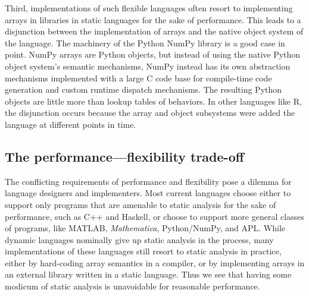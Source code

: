 \documentclass[preprint]{sigplanconf}
\newcommand{\MATLAB}{\textsc{MATLAB}}
\newcommand{\Mathematica}{\textit{Mathematica}}
\begin{document}
Third, implementations of such flexible languages often resort to implementing
arrays in libraries in static languages for the sake of performance. This
leads to a disjunction between the implementation of arrays and the native
object system of the language. The machinery of the Python NumPy library is a
good case in point. NumPy arrays are Python objects, but instead of using the
native Python object system's semantic mechanisms, NumPy instead has its own
abstraction mechanisms implemented with a large C code base for compile-time
code generation and custom runtime dispatch mechanisms. The resulting Python
objects are little more than lookup tables of behaviors. In
other languages like R, the disjunction occurs because the array and object
subsystems were added the language at different points in time.



\subsection{The performance---flexibility trade-off}

The conflicting requirements of performance and flexibility pose a dilemma for
language designers and implementers. Most current languages choose either to
support only programs that are amenable to static analysis for the sake of
performance, such as C++ and Haskell, or choose to support more general
classes of programs, like \MATLAB, \Mathematica, Python/NumPy, and APL. While
dynamic languages nominally give up static analysis in the process, many
implementations of these languages still resort to static analysis in
practice, either by hard-coding array semantics in a compiler, or by
implementing arrays in an external library written in a static language. Thus
we see that having some modicum of static analysis is unavoidable for
reasonable performance.
\end{document}
